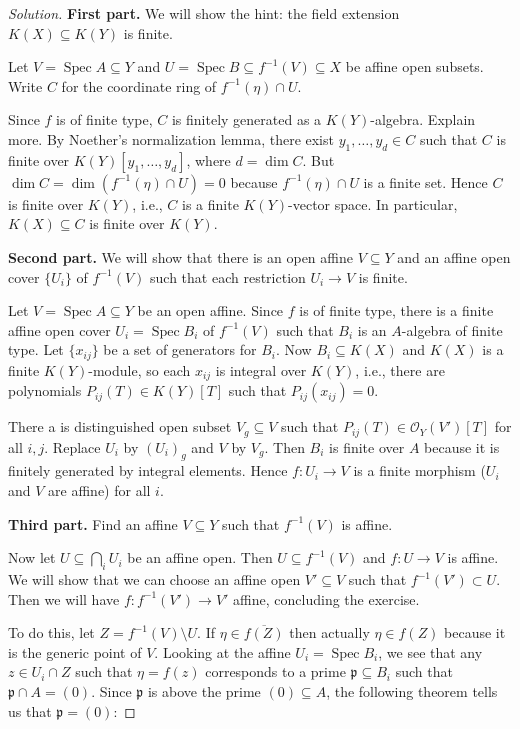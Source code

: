 \begin{proof}[Solution]\leavevmode
	\textbf{First part.}
We will show the hint: the field extension $K(X) \subseteq K(Y)$ is finite.

Let $V = \operatorname{Spec} A \subseteq Y$ and $U = \operatorname{Spec} B \subseteq f^{-1}(V) \subseteq X$ be affine open subsets.
Write $C$ for the coordinate ring of $f^{-1}(\eta) \cap U$.

Since $f$ is of finite type, $C$ is finitely generated as a $K(Y)$-algebra.
Explain more. %
By Noether's normalization lemma, there exist $y_1, \ldots, y_d \in C$ such that $C$ is finite over $K(Y)[y_1,\ldots,y_d]$, where $d = \dim C$.
But $\dim C = \dim (f^{-1}(\eta) \cap U) = 0$ because $f^{-1}(\eta) \cap U$ is a finite set.
Hence $C$ is finite over $K(Y)$, i.e., $C$ is a finite $K(Y)$-vector space.
In particular, $K(X) \subseteq C$ is finite over $K(Y)$.

\textbf{Second part.}
We will show that there is an open affine $V \subseteq Y$ and an affine open cover $\{U_i\}$ of $f^{-1}(V)$ such that each restriction $U_i \to V$ is finite.

Let $V=\operatorname{Spec} A \subseteq Y$ be an open affine.
Since $f$ is of finite type, there is a finite affine open cover $U_i = \operatorname{Spec} B_i$ of $f^{-1}(V)$ such that $B_i$ is an $A$-algebra of finite type. Let $\{x_{ij}\}$ be a set of generators for $B_i$.
Now $B_i \subseteq K(X)$ and $K(X)$ is a finite $K(Y)$-module, so each $x_{ij}$ is integral over $K(Y)$, i.e., there are polynomials $P_{ij}(T) \in K(Y)[T]$ such that $P_{ij}(x_{ij}) = 0$.

There a is distinguished open subset $V_g \subseteq V$ such that $P_{ij}(T) \in \mathcal{O}_Y(V')[T]$ for all $i,j$.
Replace $U_i$ by $(U_i)_g$ and $V$ by $V_g$. Then $B_i$ is finite over $A$ because it is finitely generated by integral elements.
Hence $f : U_i \to V$ is a finite morphism ($U_i$ and $V$ are affine) for all $i$.

\textbf{Third part.}
Find an affine $V \subseteq Y$ such that $f^{-1}(V)$ is affine.

Now let $U \subseteq \bigcap_i U_i$ be an affine open.
Then $U \subseteq f^{-1}(V)$ and $f : U \to V$ is affine. We will show that we can choose an affine open $V' \subseteq V$ such that $f^{-1}(V') \subset U$. Then we will have $f : f^{-1}(V') \to V'$ affine, concluding the exercise.

To do this, let $Z = f^{-1}(V) \setminus U$.
If $\eta \in \overline{f(Z)}$ then actually $\eta \in f(Z)$ because it is the generic point of $V$.
Looking at the affine $U_i = \operatorname{Spec} B_i$, we see that any $z \in U_i \cap Z$ such that $\eta = f(z)$ corresponds to a prime $\mathfrak{p} \subseteq B_i$ such that $\mathfrak{p} \cap A = (0)$. Since $\mathfrak{p}$ is above the prime $(0) \subseteq A$, the following theorem tells us that $\mathfrak{p} = (0)$:


\end{proof}
